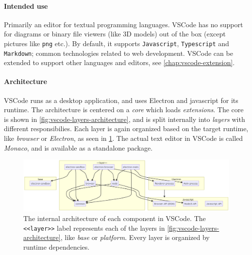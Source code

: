 \paragraph*{Intended use} Primarily an editor for textual programming languages.
VSCode has no support for diagrams or binary file viewers (like 3D models) out of the box (except pictures like \texttt{png} etc.). By default, it supports \texttt{Javascript}, \texttt{Typescript} and \texttt{Markdown}; common technologies related to web development.
VSCode can be extended to support other languages and editors, see \cref{chap:vscode-extension}.


\paragraph*{Architecture}
VSCode runs as a desktop application, and uses Electron and javascript for its runtime.
The architecture is centered on a \emph{core} which loads \emph{extensions}.
The core is shown in \cref{fig:vscode-layers-architecture}, and is split internally into \emph{layers} with different responsibilies.
Each layer is again organized based on the target runtime, like \emph{browser} or \emph{\gls{Electron}}, as seen in \cref{fig:vscode-component-architecture}.
The actual text editor in \gls{VSCode} is called \emph{Monaco}, and is available as a standalone package.~\cite{benjaminpaseroSourceCodeOrganization2020}


\begin{figure}[htbp]  %
  \centering %
  \includegraphics[width=\textwidth]{figures/vscode-component-architecture}
  \caption[VSCode component Architecture]{The internal architecture of each component in VSCode. The \texttt{<<layer>>} label represents each of the layers in \cref{fig:vscode-layers-architecture}, like \emph{base} or \emph{platform}. Every layer is organized by runtime dependencies.~\cite{benjaminpaseroSourceCodeOrganization2020}}\label{fig:vscode-component-architecture}
\end{figure}


